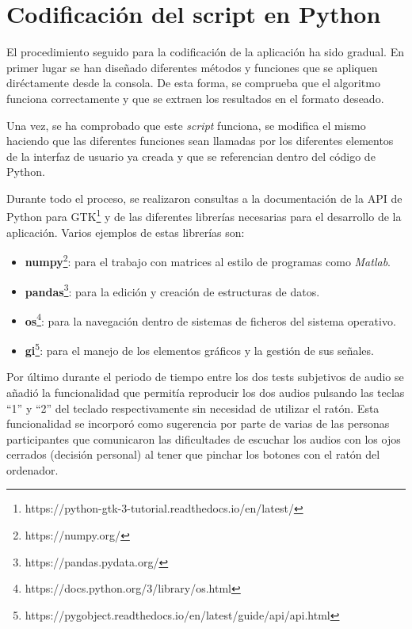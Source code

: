 \documentclass[11pt,a4paper,twoside]{book}
\begin{document}
        \section{Codificación del script en Python}            
            El procedimiento seguido para la codificación de la aplicación ha sido gradual. En primer lugar se han diseñado diferentes métodos y funciones que se apliquen diréctamente desde la consola. De esta forma, se comprueba que el algoritmo funciona correctamente y que se extraen los resultados en el formato deseado.
            
            Una vez, se ha comprobado que este \textit{script} funciona, se modifica el mismo haciendo que las diferentes funciones sean llamadas por los diferentes elementos de la interfaz de usuario ya creada y que se referencian dentro del código de Python.
            
            Durante todo el proceso, se realizaron consultas a la documentación de la API de Python para GTK\footnote{https://python-gtk-3-tutorial.readthedocs.io/en/latest/} y de las diferentes librerías necesarias para el desarrollo de la aplicación. Varios ejemplos de estas librerías son:
            \begin{itemize}
                \item \textbf{numpy}\footnote{https://numpy.org/}: para el trabajo con matrices al estilo de programas como \textit{Matlab}.
                \item \textbf{pandas}\footnote{https://pandas.pydata.org/}: para la edición y creación de estructuras de datos.
                \item \textbf{os}\footnote{https://docs.python.org/3/library/os.html}: para la navegación dentro de sistemas de ficheros del sistema operativo.
                \item \textbf{gi}\footnote{https://pygobject.readthedocs.io/en/latest/guide/api/api.html}: para el manejo de los elementos gráficos y la gestión de sus señales.
            \end{itemize}
            
            Por último durante el periodo de tiempo entre los dos tests subjetivos de audio se añadió la funcionalidad que permitía reproducir los dos audios pulsando las teclas ``1'' y ``2'' del teclado respectivamente sin necesidad de utilizar el ratón. Esta funcionalidad se incorporó como sugerencia por parte de varias de las personas participantes que comunicaron las dificultades de escuchar los audios con los ojos cerrados (decisión personal) al tener que pinchar los botones con el ratón del ordenador.
            
\end{document}
